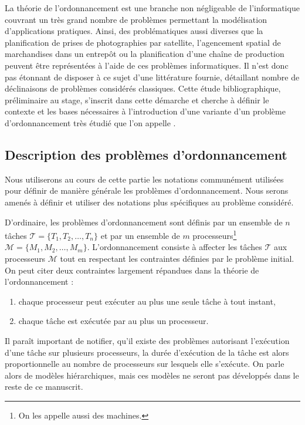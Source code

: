 La théorie de l'ordonnancement est une branche non négligeable de l'informatique couvrant un très
grand nombre de problèmes permettant la modélisation d'applications pratiques. Ainsi, des
problématiques aussi diverses que la planification de prises de photographies par satellite,
l'agencement spatial de marchandises dans un entrepôt ou la planification d'une chaîne de production
peuvent être représentées à l'aide de ces problèmes informatiques. Il n'est donc pas étonnant de
disposer à ce sujet d'une littérature fournie, détaillant nombre de déclinaisons de problèmes
considérés classiques. Cette étude bibliographique, préliminaire au stage, s'inscrit dans cette
démarche et cherche à définir le contexte et les bases nécessaires à l'introduction d'une variante
d'un problème d'ordonnancement très étudié que l'on appelle \isched.

\subsection{Description des problèmes d'ordonnancement}

Nous utiliserons au cours de cette partie les notations communément utilisées pour définir de
manière générale les problèmes d'ordonnancement. Nous serons amenés à définir et utiliser des
notations plus spécifiques au problème considéré.

D'ordinaire, les problèmes d'ordonnancement sont définis par un ensemble de $n$ tâches $\mathcal{T} =
\{T_1, T_2, \dots, T_n\}$ et par un ensemble de $m$ processeurs\footnote{On les appelle aussi des
machines.} $\mathcal{M} = \{M_1, M_2, \dots, M_m\}$. L'ordonnancement consiste à affecter les
tâches $\mathcal{T}$ aux processeurs $\mathcal{M}$ tout en respectant les contraintes définies par
le problème initial. On peut citer deux contraintes largement répandues dans la théorie de
l'ordonnancement :
\begin{enumerate}
    \item chaque processeur peut exécuter au plus une seule tâche à tout instant,
    \item chaque tâche est exécutée par au plus un processeur.
\end{enumerate}

Il paraît important de notifier, qu'il existe des problèmes autorisant l'exécution d'une tâche sur
plusieurs processeurs, la durée d'exécution de la tâche est alors proportionnelle au nombre de
processeurs sur lesquels elle s'exécute. On parle alors de modèles hiérarchiques, mais ces modèles
ne seront pas développés dans le reste de ce manuscrit.

